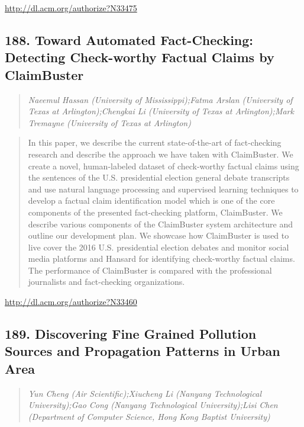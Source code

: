 \documentclass{article}
\begin{document}
\href{http://dl.acm.org/authorize?N33475}{http://dl.acm.org/authorize?N33475}

\subsection{188. Toward Automated Fact-Checking: Detecting Check-worthy Factual Claims by ClaimBuster}

\begin{quote}
\footnotesize{\textit{Naeemul Hassan (University of Mississippi);Fatma Arslan (University of Texas at Arlington);Chengkai Li (University of Texas at Arlington);Mark Tremayne (University of Texas at Arlington)}}

\end{quote}

\begin{quote}
In this paper, we describe the current state-of-the-art of fact-checking research and describe the approach we have taken with ClaimBuster. We create a novel, human-labeled dataset of check-worthy factual claims using the sentences of the U.S. presidential election general debate transcripts and use natural language processing and supervised learning techniques to develop a factual claim identification model which is one of the core components of the presented fact-checking platform, ClaimBuster. We describe various components of the ClaimBuster system architecture and outline our development plan. We showcase how ClaimBuster is used to live cover the 2016 U.S. presidential election debates and monitor social media platforms and Hansard for identifying check-worthy factual claims. The performance of ClaimBuster is compared with the professional journalists and fact-checking organizations.
\end{quote}

\href{http://dl.acm.org/authorize?N33460}{http://dl.acm.org/authorize?N33460}

\subsection{189. Discovering Fine Grained Pollution Sources  and Propagation Patterns in Urban Area}

\begin{quote}
\footnotesize{\textit{Yun Cheng (Air Scientific);Xiucheng Li (Nanyang Technological University);Gao Cong (Nanyang Technological University);Lisi Chen (Department of Computer Science, Hong Kong Baptist University)}}

\end{quote}
\end{document}
